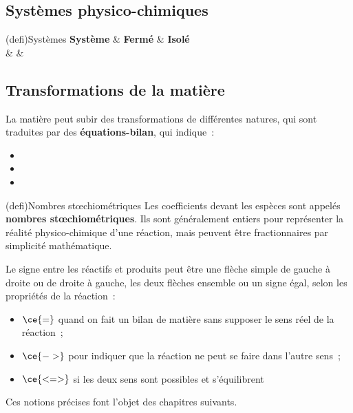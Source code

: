 \documentclass[../../main/main.tex]{subfiles}
\begin{document}
\subsection{Systèmes physico-chimiques}
\begin{tcb}[label=def:système, tabularx={Y|Y|Y}](defi){Systèmes}
	\textbf{Système} & \textbf{Fermé} & \textbf{Isolé}
	\\\hline
	&
	&
\end{tcb}

\subsection{Transformations de la matière}

La matière peut subir des transformations de différentes natures, qui sont
traduites par des \textbf{équations-bilan}, qui indique~:
\begin{itemize}
	\item {}
	\item {}
	\item {}
\end{itemize}

\begin{tcb}(defi){Nombres stœchiométriques}
	Les coefficients devant les espèces sont appelés \textbf{nombres
		stœchiométriques}. Ils sont généralement entiers pour représenter la réalité
	physico-chimique d'une réaction, mais peuvent être fractionnaires par
	simplicité mathématique.
\end{tcb}


Le signe entre les réactifs et produits
peut être une flèche simple de gauche à droite ou de droite à gauche,
les deux flèches ensemble ou un signe égal, selon les propriétés de la
réaction~:
\begin{itemize}
	\item $\ce{=}$ quand on fait un bilan de matière sans supposer le sens réel de
	      la réaction~;
	\item $\ce{->}$ pour indiquer que la réaction ne peut se faire dans l'autre
	      sens~;
	\item $\ce{<=>}$ si les deux sens sont possibles et s'équilibrent
\end{itemize}
Ces notions précises font l'objet des chapitres suivants.
\end{document}

